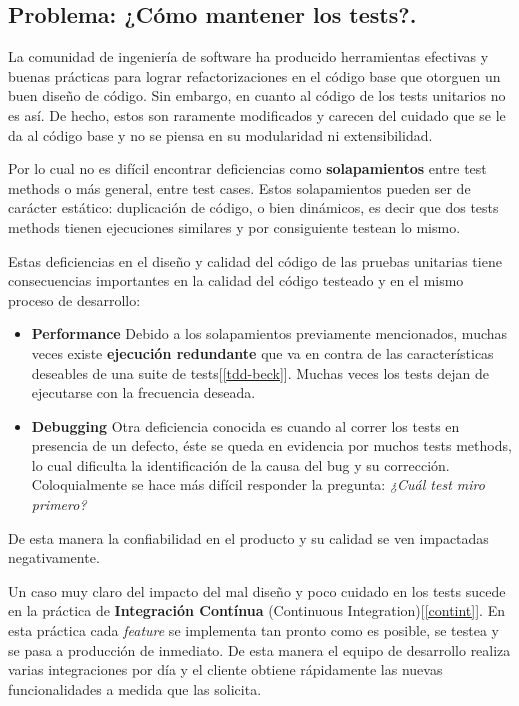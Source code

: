\subsection{Problema: ¿Cómo mantener los tests?.}

\par La comunidad de ingeniería de software ha producido herramientas efectivas y buenas prácticas para lograr refactorizaciones en el código base que otorguen un buen diseño de código. Sin embargo, en cuanto al código de los tests unitarios no es así. De hecho, estos son raramente modificados y carecen del cuidado que se le da al código base y no se piensa en su modularidad ni extensibilidad. 

\par Por lo cual no es difícil encontrar deficiencias como \textbf{solapamientos} entre test methods o más general, entre test cases. Estos solapamientos pueden ser de carácter estático: duplicación de código, o bien dinámicos, es decir que dos tests methods tienen ejecuciones similares y por consiguiente testean lo mismo. 
\par Estas deficiencias en el diseño y calidad del código de las pruebas unitarias tiene consecuencias importantes en la calidad del código testeado y en el mismo proceso de desarrollo:
\begin{itemize}
\item \textbf{Performance} Debido a los solapamientos previamente mencionados, muchas veces existe \textbf{ejecución redundante} que va en contra de las características deseables de una suite de tests[\ref{tdd-beck}]. Muchas veces los tests dejan de ejecutarse con la frecuencia deseada.
\item \textbf{Debugging} Otra deficiencia conocida es cuando al correr los tests en presencia de un defecto, éste se queda en evidencia por muchos tests methods, lo cual dificulta la identificación de la causa del bug y su corrección. Coloquialmente se hace más difícil responder la pregunta: \emph{¿Cuál test miro primero?}
\end{itemize}
 
\par De esta manera la confiabilidad en el producto y su calidad se ven impactadas negativamente. 

\par Un caso muy claro del impacto del mal diseño y poco cuidado en los tests sucede en la práctica de \textbf{Integración Contínua} (Continuous Integration)[\ref{contint}]. En esta práctica cada \emph{feature} se implementa tan pronto como es posible, se testea y se pasa a producción de inmediato. De esta manera el equipo de desarrollo realiza varias integraciones por día y el cliente obtiene rápidamente las nuevas funcionalidades a medida que las solicita. \\

